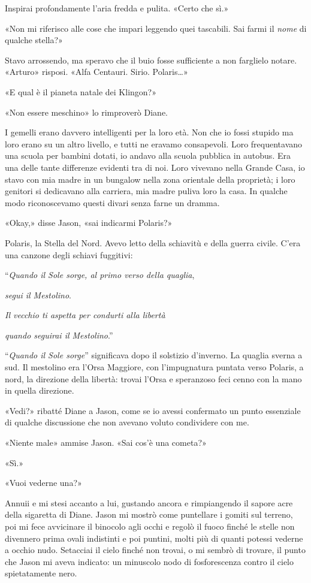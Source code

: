 Inspirai profondamente l'aria fredda e pulita. «Certo che sì.»

«Non mi riferisco alle cose che impari leggendo quei tascabili. Sai
farmi il \emph{nome} di qualche stella?»

Stavo arrossendo, ma speravo che il buio fosse sufficiente a non
farglielo notare. «Arturo» risposi. «Alfa Centauri. Sirio.
Polaris\ldots»

«E qual è il pianeta natale dei Klingon?»

«Non essere meschino» lo rimproverò Diane.

I gemelli erano davvero intelligenti per la loro età. Non che io fossi
stupido ma loro erano su un altro livello, e tutti ne eravamo
consapevoli. Loro frequentavano una scuola per bambini dotati, io andavo
alla scuola pubblica in autobus. Era una delle tante differenze evidenti
tra di noi. Loro vivevano nella Grande Casa, io stavo con mia madre in
un bungalow nella zona orientale della proprietà; i loro genitori si
dedicavano alla carriera, mia madre puliva loro la casa. In qualche modo
riconoscevamo questi divari senza farne un dramma.

«Okay,» disse Jason, «sai indicarmi Polaris?»

Polaris, la Stella del Nord. Avevo letto della schiavitù e della guerra
civile. C'era una canzone degli schiavi fuggitivi:

``\emph{Quando il Sole sorge, al primo verso della quaglia},

\emph{segui il Mestolino}.

\emph{Il vecchio ti aspetta per condurti alla libertà}

\emph{quando seguirai il Mestolino}.''

``\emph{Quando il Sole sorge}'' significava dopo il solstizio d'inverno.
La quaglia sverna a sud. Il mestolino era l'Orsa Maggiore, con
l'impugnatura puntata verso Polaris, a nord, la direzione della libertà:
trovai l'Orsa e speranzoso feci cenno con la mano in quella direzione.

«Vedi?» ribatté Diane a Jason, come se io avessi confermato un punto
essenziale di qualche discussione che non avevano voluto condividere con
me.

«Niente male» ammise Jason. «Sai cos'è una cometa?»

«Sì.»

«Vuoi vederne una?»

Annuii e mi stesi accanto a lui, gustando ancora e rimpiangendo il
sapore acre della sigaretta di Diane. Jason mi mostrò come puntellare i
gomiti sul terreno, poi mi fece avvicinare il binocolo agli occhi e
regolò il fuoco finché le stelle non divennero prima ovali indistinti e
poi puntini, molti più di quanti potessi vederne a occhio nudo.
Setacciai il cielo finché non trovai, o mi sembrò di trovare, il punto
che Jason mi aveva indicato: un minuscolo nodo di fosforescenza contro
il cielo spietatamente nero.

